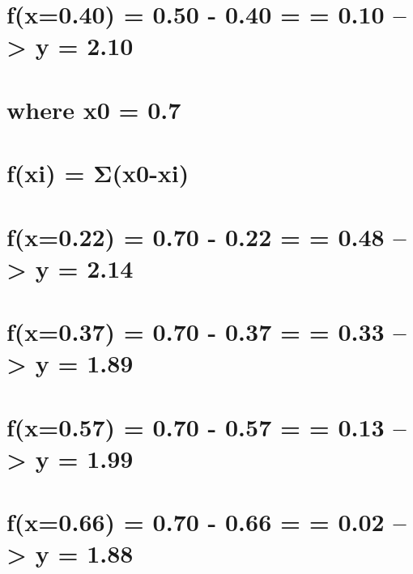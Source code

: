 \documentclass[
  letterpaper,
  DIV=11,
  numbers=noendperiod]{scrreprt}
\begin{document}
{

\chapter{f(x=0.40) = 0.50 - 0.40 = \textbar{} = 0.10
--\textgreater{} y = 2.10}\label{fx0.40-0.50---0.40--0.10-0.10-y-2.10}


\chapter{where x0 = 0.7}\label{where-x0-0.7}


\chapter{f(xi) = Σ(x0-xi)}\label{fxi-ux3c3x0-xi-2}


\chapter{f(x=0.22) = 0.70 - 0.22 = \textbar{} = 0.48
--\textgreater{} y = 2.14}\label{fx0.22-0.70---0.22-0.48-0.48-y-2.14}


\chapter{f(x=0.37) = 0.70 - 0.37 = \textbar{} = 0.33
--\textgreater{} y = 1.89}\label{fx0.37-0.70---0.37-0.33-0.33-y-1.89}


\chapter{f(x=0.57) = 0.70 - 0.57 = \textbar{} = 0.13
--\textgreater{} y = 1.99}\label{fx0.57-0.70---0.57-0.13-0.13-y-1.99}


\chapter{f(x=0.66) = 0.70 - 0.66 = \textbar{} = 0.02
--\textgreater{} y = 1.88}\label{fx0.66-0.70---0.66--0.02-0.02-y-1.88}

}
\end{document}
